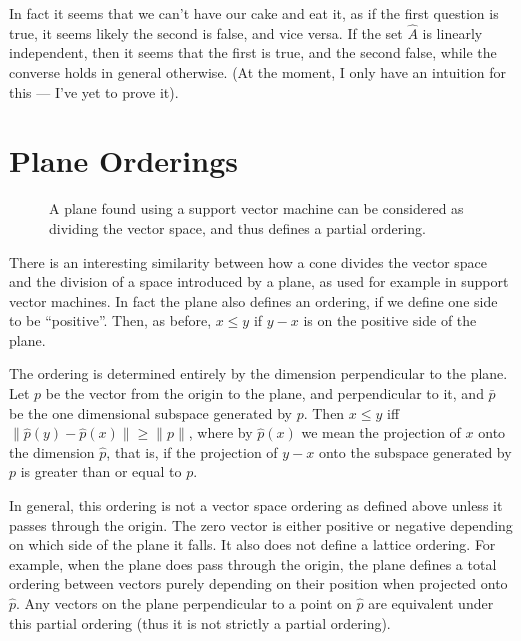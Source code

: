 \documentclass{article}
\begin{document}
In fact it seems that we can't have our cake and eat it, as if the
first question is true, it seems likely the second is false, and vice
versa. If the set $\hat{A}$ is linearly independent, then it seems
that the first is true, and the second false, while the converse holds
in general otherwise. (At the moment, I only have an intuition for
this --- I've yet to prove it).


\section{Plane Orderings}

\begin{figure}
\begin{center}

\end{center}
\caption{A plane found using a support vector machine can be
  considered as dividing the vector space, and thus defines a partial
  ordering.}
\end{figure}

There is an interesting similarity between how a cone divides the
vector space and the division of a space introduced by a plane, as
used for example in support vector machines. In fact the plane also
defines an ordering, if we define one side to be ``positive''. Then,
as before, $x \le y$ if $y - x$ is on the positive side of the plane.

The ordering is determined entirely by the dimension perpendicular to
the plane. Let $p$ be the vector from the origin to the plane, and
perpendicular to it, and $\bar{p}$ be the one dimensional subspace
generated by $p$. Then $x \le y$ iff $\|\hat{p}(y) - \hat{p}(x)\| \ge
\|p\|$, where by $\hat{p}(x)$ we mean the projection of $x$ onto the
dimension $\hat{p}$, that is, if the projection of $y - x$ onto the
subspace generated by $p$ is greater than or equal to $p$.

In general, this ordering is not a vector space ordering as defined
above unless it passes through the origin. The zero vector is either
positive or negative depending on which side of the plane it
falls. It also does not define a lattice ordering. For example, when
the plane does pass through the origin, the plane defines a total
ordering between vectors purely depending on their position when
projected onto $\hat{p}$. Any vectors on the plane perpendicular to a
point on $\hat{p}$ are equivalent under this partial ordering (thus it
is not strictly a partial ordering).




\end{document}
